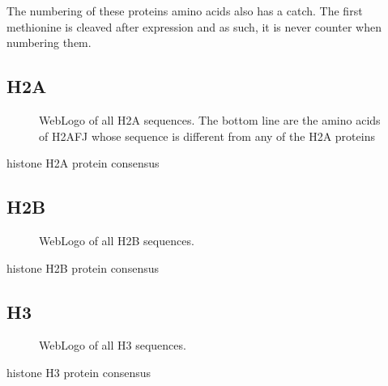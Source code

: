 \documentclass[10pt,a4paper,draft,article]{memoir}
\begin{document}
    The numbering of these proteins amino acids also has a catch. The first methionine is cleaved after expression and as such, it is
    never counter when numbering them.

    \subsection{H2A}
      \begin{figure}
        \centering
        \caption{WebLogo of all H2A sequences. The bottom line are the amino acids of H2AFJ whose sequence is different from any of the H2A proteins}
        \label{fig:h2a-weblogo}
      \end{figure}

      \begin{table}
        \centering
%        
        \caption{histone H2A protein consensus}
        \label{tab:H2A-consensus}
      \end{table}


    \subsection{H2B}
      \begin{figure}
        \centering
        \caption{WebLogo of all H2B sequences.}
        \label{fig:h2b-weblogo}
      \end{figure}
      \begin{table}
        \centering
%        
        \caption{histone H2B protein consensus}
        \label{tab:H2B-consensus}
      \end{table}

    \subsection{H3}
      \begin{figure}
        \centering
        \caption{WebLogo of all H3 sequences.}
        \label{fig:h3-weblogo}
      \end{figure}
      \begin{table}
        \centering
%        
        \caption{histone H3 protein consensus}
        \label{tab:H3-consensus}
      \end{table}
\end{document}
